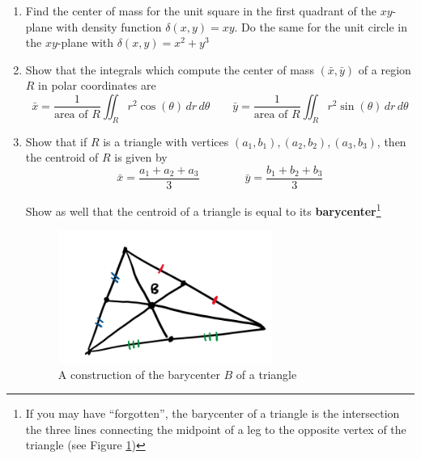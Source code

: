\documentclass[12pt]{article}
\numberwithin{equation}{subsection}
\numberwithin{figure}{subsection}
\theoremstyle{note}
\begin{document}
{\begin{enumerate}[label=\arabic*.]
\begin{enumerate}
	\item $R$ the triangle in the $xy$-plane with vertices $(0,0), (0,4), (3,0)$ 
	\item $R$ the portion of the disc $x^2+y^2=9$ within the first quadrant
	\item $R$ the unit square in the first quadrant
	\item $R$ the region bound by $y=1/x, y=-1/x$ and the lines $y=\pm 2, x=\pm 2$
\end{enumerate}
\item  Find the center of mass for the unit square in the first quadrant of the $xy$-plane with density function $\delta(x,y)=xy$. Do the same for the unit circle in the $xy$-plane with $\delta(x,y)=x^2+y^3$

\item  Show that the integrals which compute the center of mass $(\bar{x},\bar{y})$ of a region $R$ in polar coordinates are
 \[ \bar{x}=\dfrac{1}{\text{area of $R$}} \iint_R r^2 \cos(\theta) \,d{r}\,d\theta \qquad \bar{y}=\dfrac{1}{\text{area of $R$}} \iint_R r^2 \sin(\theta) \,d{r}\,d\theta\]
 
 \item  Show that if $R$ is a triangle with vertices $(a_1,b_1), (a_2,b_2), (a_3,b_3)$, then the centroid of $R$ is given by \begin{equation} \bar{x} =\dfrac{a_1+a_2+a_3}{3}\qquad \qquad \bar{y} = \dfrac{b_1+b_2+b_3}{3}\end{equation}

Show as well that the centroid of a triangle is equal to its \textbf{barycenter}\footnote{If you may have ``forgotten'', the barycenter of a triangle is the intersection the three lines connecting the midpoint of a leg to the opposite vertex of the triangle (see Figure \ref{fig-barycenter})}

\begin{figure}[h!] \centering
\includegraphics[width=70mm]{Images/barycenter}
\caption{A construction of the barycenter $B$ of a triangle}
\label{fig-barycenter}
\end{figure}


\end{enumerate}}
\end{document}
